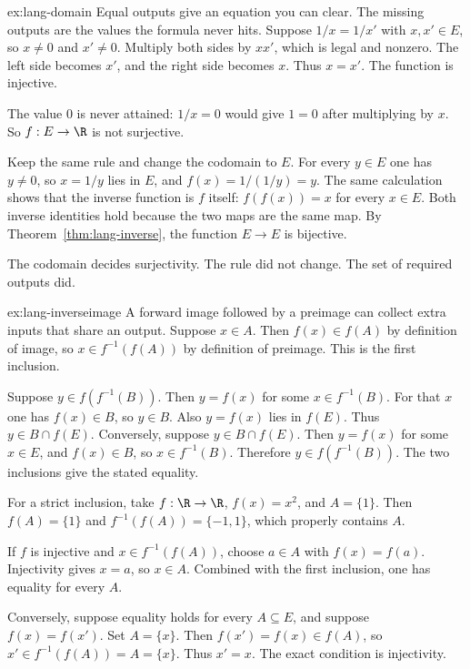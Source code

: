 \begin{solution}{ex:lang-domain}
\idea Equal outputs give an equation you can clear. The missing outputs are the values the formula never hits.
\writeup Suppose $1/x=1/x'$ with $x,x'\in E$, so $x\ne 0$ and $x'\ne 0$. Multiply both sides by $xx'$, which is legal and nonzero. The left side becomes $x'$, and the right side becomes $x$. Thus $x=x'$. The function is injective.

The value $0$ is never attained: $1/x=0$ would give $1=0$ after multiplying by $x$. So $f:E\to\R$ is not surjective.

Keep the same rule and change the codomain to $E$. For every $y\in E$ one has $y\ne 0$, so $x=1/y$ lies in $E$, and $f(x)=1/(1/y)=y$. The same calculation shows that the inverse function is $f$ itself: $f(f(x))=x$ for every $x\in E$. Both inverse identities hold because the two maps are the same map. By Theorem~\ref{thm:lang-inverse}, the function $E\to E$ is bijective.

The codomain decides surjectivity. The rule did not change. The set of required outputs did.
\end{solution}

\begin{solution}{ex:lang-inverseimage}
\idea A forward image followed by a preimage can collect extra inputs that share an output.
\writeup Suppose $x\in A$. Then $f(x)\in f(A)$ by definition of image, so $x\in f^{-1}(f(A))$ by definition of preimage. This is the first inclusion.

Suppose $y\in f(f^{-1}(B))$. Then $y=f(x)$ for some $x\in f^{-1}(B)$. For that $x$ one has $f(x)\in B$, so $y\in B$. Also $y=f(x)$ lies in $f(E)$. Thus $y\in B\cap f(E)$. Conversely, suppose $y\in B\cap f(E)$. Then $y=f(x)$ for some $x\in E$, and $f(x)\in B$, so $x\in f^{-1}(B)$. Therefore $y\in f(f^{-1}(B))$. The two inclusions give the stated equality.

For a strict inclusion, take $f:\R\to\R$, $f(x)=x^2$, and $A=\{1\}$. Then $f(A)=\{1\}$ and $f^{-1}(f(A))=\{-1,1\}$, which properly contains $A$.

If $f$ is injective and $x\in f^{-1}(f(A))$, choose $a\in A$ with $f(x)=f(a)$. Injectivity gives $x=a$, so $x\in A$. Combined with the first inclusion, one has equality for every $A$.

Conversely, suppose equality holds for every $A\subseteq E$, and suppose $f(x)=f(x')$. Set $A=\{x\}$. Then $f(x')=f(x)\in f(A)$, so $x'\in f^{-1}(f(A))=A=\{x\}$. Thus $x'=x$. The exact condition is injectivity.
\end{solution}

